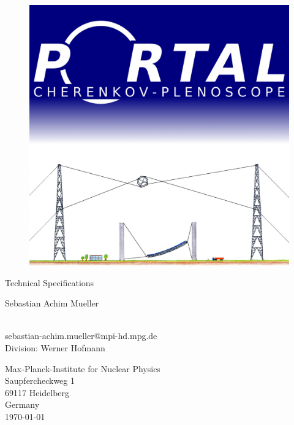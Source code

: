 \documentclass[11pt,a4paper,oneside,titlepage]{article}
\begin{document}
\begin{center}
    \begin{figure}[H]
        \includegraphics[width=1.0\textwidth]{figures/portal.jpg}
    \end{figure}
    \begin{huge}
        Technical Specifications
    \end{huge}
    \vfill
    \begin{Large}
        Sebastian Achim Mueller
    \end{Large}
    \\
    sebastian-achim.mueller@mpi-hd.mpg.de\\
    Division: Werner Hofmann\\
    \vspace{20pt}
    \par\smallskip\noindent
    Max-Planck-Institute for Nuclear Physics\\
    Saupfercheckweg 1\\
    69117 Heidelberg\\
    Germany\\
    \today
\end{center}
\newpage
\tableofcontents
\cleardoublepage
%
\setcounter{page}{0}
%
\linenumbers
\newcommand{\OutOfFocus}{\textit{out of focus}}
\newcommand{\InFocus}{\textit{in focus}}
\newcommand{\FocalRatio}{F}
\newcommand{\FocalLength}{f}
\newcommand{\ImageDistance}{b}
\newcommand{\ImageSensorDistance}{d}
\newcommand{\ObjectDistance}{g}
\newcommand{\ApertureDiameter}{D}
\newcommand{\ApertureFunction}{A}
\newcommand{\BokehFunction}{B}
\newcommand{\FieldOfView}{\alpha}
\newcommand{\BokehRadius}{r_\BokehFunction}
\newcommand{\BokehTemplateFunction}{\BokehFunction_{\text{template}}}
\newcommand{\ApertureRadius}{r_\ApertureFunction}
\newcommand{\zHy}{{z_\text{Hy}}}
\newcommand{\zPa}{{z_\text{Pa}}}
\newcommand{\zDC}{{z_\text{DC}}}
\end{document}
